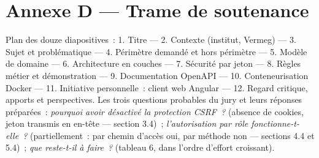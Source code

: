 \documentclass[12pt,a4paper]{report}
\begin{document}
\chapter*{Annexe D — Trame de soutenance}
Plan des douze diapositives~: 1. Titre — 2. Contexte (institut, Vermeg) — 3. Sujet et problématique — 4. Périmètre demandé et hors périmètre — 5. Modèle de domaine — 6. Architecture en couches — 7. Sécurité par jeton — 8. Règles métier et démonstration — 9. Documentation OpenAPI — 10. Conteneurisation Docker — 11. Initiative personnelle~: client web Angular — 12. Regard critique, apports et perspectives.
Les trois questions probables du jury et leurs réponses préparées~: \textit{pourquoi avoir désactivé la protection CSRF~?} (absence de cookies, jeton transmis en en-tête — section 3.4)~; \textit{l'autorisation par rôle fonctionne-t-elle~?} (partiellement~: par chemin d'accès oui, par méthode non — sections 4.4 et 5.4)~; \textit{que reste-t-il à faire~?} (tableau 6, dans l'ordre d'effort croissant).
\end{document}

